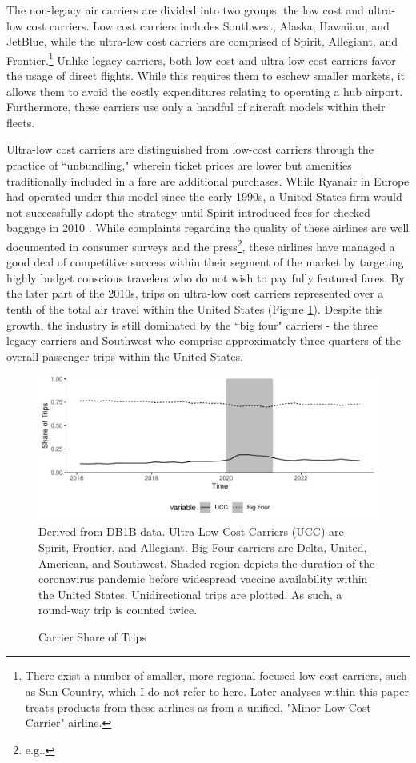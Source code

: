 \documentclass{article}
\begin{document}
	The non-legacy air carriers are divided into two groups, the low cost and ultra-low cost carriers. Low cost carriers includes Southwest, Alaska,  Hawaiian, and JetBlue, while the ultra-low cost carriers are comprised of Spirit, Allegiant, and Frontier.\footnote{There exist a number of smaller, more regional focused low-cost carriers, such as Sun Country, which I do not refer to here. Later analyses within this paper treats products from these airlines as from a unified, "Minor Low-Cost Carrier" airline.} Unlike legacy carriers, both low cost and ultra-low cost carriers favor the usage of direct flights. While this requires them to eschew smaller markets, it allows them to avoid the costly expenditures relating to operating a hub airport. Furthermore, these carriers use only a handful of aircraft models within their fleets.

	Ultra-low cost carriers are distinguished from low-cost carriers through the practice of ``unbundling," wherein ticket prices are lower but amenities traditionally included in a fare are additional purchases. While Ryanair in Europe had operated under this model since the early 1990s, a United States firm would not successfully adopt the strategy until Spirit introduced fees for checked baggage in 2010 \citep{bachwich_emergence_2017}. While complaints regarding the quality of these airlines are well documented in consumer surveys and the press\footnote{e.g.\citet{vasel_spirit_2016, elliott_jetblue_2022}.}, these airlines have managed a good deal of competitive success within their segment of the market by targeting highly budget conscious travelers who do not wish to pay fully featured fares. By the later part of the 2010s, trips on ultra-low cost carriers represented over a tenth of the total air travel within the United States (Figure \ref{fig:ULCC_Trips}).  Despite this growth, the industry is still dominated by the ``big four" carriers - the three legacy carriers and Southwest who comprise approximately three quarters of the overall passenger trips within the United States. 

    	\begin{figure}
		\caption{Carrier Share of Trips}
		\label{fig:ULCC_Trips}
		\includegraphics[width = \linewidth]{Carrier_Share}
		\footnotesize{Derived from DB1B data. Ultra-Low Cost Carriers (UCC) are Spirit, Frontier, and Allegiant. Big Four carriers are Delta, United, American, and Southwest. Shaded region depicts the duration of the coronavirus pandemic before widespread vaccine availability within the United States. Unidirectional trips are plotted. As such, a round-way trip is counted twice.}
	\end{figure}
	
\end{document}
